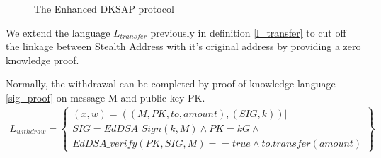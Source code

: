 \begin{figure}[H]
\centering
{}
\caption{The Enhanced DKSAP protocol}
\label{fig:edksap}
\end{figure}

We extend the language $L_{transfer}$ previously in definition \ref{l_transfer} to cut off the linkage between Stealth Address with it's original address by providing a zero knowledge proof.  

Normally, the withdrawal can be completed by proof of knowledge language \ref{sig_proof} on message M and public key PK.
\begin{equation}\label{sig_proof}
    \begin{aligned}
        L_{withdraw} = \left\{
                \begin{array}{c}
                        (x, w) = ((M, PK, to, amount), (SIG, k)) | \\ 
                    SIG = EdDSA\_Sign(k, M) \land PK = kG \land \\
                        EdDSA\_verify(PK, SIG, M) == true \land to.transfer(amount)
                \end{array}    
                    \right\} 
    \end{aligned}
\end{equation}

